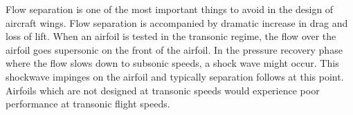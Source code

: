 \documentclass[a4paper, 12pt]{report}
\begin{document}
Flow separation is one of the most important things to avoid in the design of aircraft wings. Flow separation is accompanied by dramatic increase in drag and loss of lift. When an airfoil is tested in the transonic regime, the flow over the airfoil goes supersonic on the front of the airfoil. In the pressure recovery phase where the flow slows down to subsonic speeds, a shock wave might occur. This shockwave impinges on the airfoil and typically separation follows at this point. Airfoils which are not designed at transonic speeds would experience poor performance at transonic flight speeds.
\end{document}
